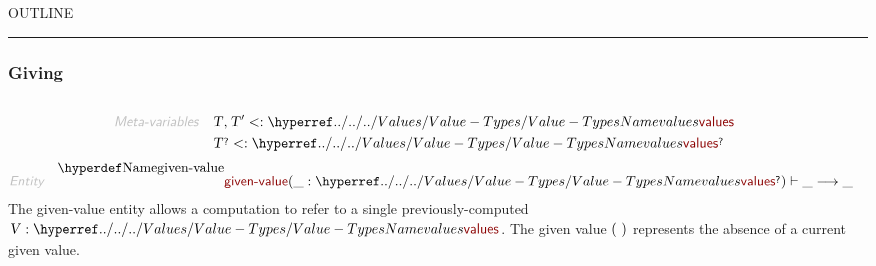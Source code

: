 


    OUTLINE
  \tableofcontents
\begin{center}
\rule{3in}{0.4pt}
\end{center}

\subsubsection{Giving}\hypertarget{giving}{}\label{giving}

\begin{align*}
  [ \
  \KEY{Entity} \quad & \NAMEREF{given-value} \\
  \KEY{Funcon} \quad & \NAMEREF{initialise-giving} \\
  \KEY{Funcon} \quad & \NAMEREF{give} \\
  \KEY{Funcon} \quad & \NAMEREF{given} \\
  \KEY{Funcon} \quad & \NAMEREF{no-given} \\
  \KEY{Funcon} \quad & \NAMEREF{left-to-right-map} \\
  \KEY{Funcon} \quad & \NAMEREF{interleave-map} \\
  \KEY{Funcon} \quad & \NAMEREF{left-to-right-repeat} \\
  \KEY{Funcon} \quad & \NAMEREF{interleave-repeat} \\
  \KEY{Funcon} \quad & \NAMEREF{left-to-right-filter} \\
  \KEY{Funcon} \quad & \NAMEREF{interleave-filter} \\
  \KEY{Funcon} \quad & \NAMEREF{fold-left} \\
  \KEY{Funcon} \quad & \NAMEREF{fold-right}
  \ ]
\end{align*}
\begin{align*}
  \KEY{Meta-variables} \quad
  & \VAR{T}, \VAR{T}' <: \NAMEHYPER{../../../Values}{Value-Types}{values} \qquad \\& \VAR{T}\QUERY <: \NAMEHYPER{../../../Values}{Value-Types}{values}\QUERY
\end{align*}
\begin{align*}
  \KEY{Entity} \quad
  & \NAMEDECL{given-value}(\_ : \NAMEHYPER{../../../Values}{Value-Types}{values}\QUERY) \vdash \_ \TRANS  \_
\end{align*}
The given-value entity allows a computation to refer to a single
  previously-computed $\SHADE{\VAR{V} : \NAMEHYPER{../../../Values}{Value-Types}{values}}$. The given value $\strut(   \  )\strut$ represents 
  the absence of a current given value.

